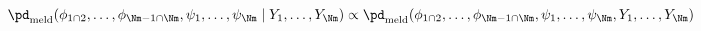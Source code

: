 \begin{equation}
  \pd_{\text{meld}} (\phi_{1 \cap 2}, \ldots, \phi_{\Nm - 1 \cap \Nm}, \psi_{1}, \ldots, \psi_{\Nm} \mid Y_{1}, \ldots, Y_{\Nm})
  \propto
  \pd_{\text{meld}} (\phi_{1 \cap 2}, \ldots, \phi_{\Nm - 1 \cap \Nm}, \psi_{1}, \ldots, \psi_{\Nm}, Y_{1}, \ldots, Y_{\Nm})
  \label{eqn:melded-posterior}
\end{equation}